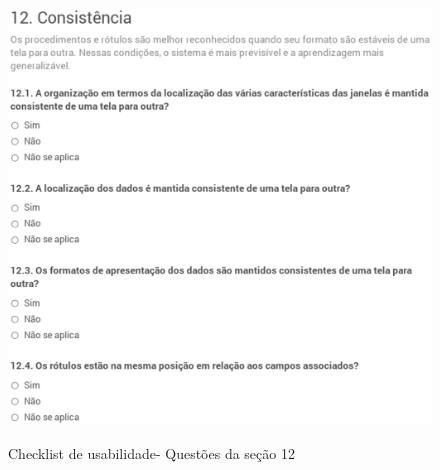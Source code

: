 	\begin{figure}[!h]
    	\centering
    	\includegraphics[keepaspectratio=true,scale=0.55]
      		{figuras/check12.eps}
    	\label{check04}
		\caption{Checklist de usabilidade- Questões da seção 12}
	\end{figure}

\newpage